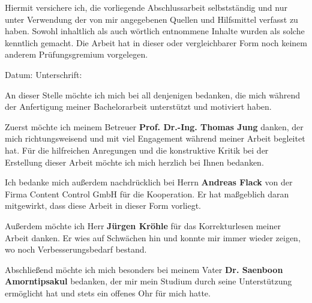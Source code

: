 \label{erklaerung}

Hiermit versichere ich, die vorliegende Abschlussarbeit selbstständig und nur unter Verwendung der von mir angegebenen Quellen und Hilfsmittel verfasst zu haben. Sowohl inhaltlich als auch wörtlich entnommene Inhalte wurden als solche kenntlich gemacht. Die Arbeit hat in dieser oder vergleichbarer Form noch keinem anderem Prüfungsgremium vorgelegen.\bigskip
\bigskip
\bigskip

Datum:	\hrulefill\enspace Unterschrift: \hrulefill

\newpage
{}
\label{danksagungen}
An dieser Stelle möchte ich mich bei all denjenigen bedanken, die mich während der Anfertigung meiner Bachelorarbeit unterstützt und motiviert haben.\bigskip

Zuerst möchte ich meinem Betreuer \textbf{Prof. Dr.-Ing. Thomas Jung} danken, der mich richtungsweisend und mit viel Engagement während meiner Arbeit begleitet hat. Für die hilfreichen Anregungen und die konstruktive Kritik bei der Erstellung dieser Arbeit möchte ich mich herzlich bei Ihnen bedanken.\bigskip

Ich bedanke mich außerdem nachdrücklich bei Herrn \textbf{Andreas Flack} von der Firma Content Control GmbH für die Kooperation. Er hat maßgeblich daran mitgewirkt, dass diese Arbeit in dieser Form vorliegt.\bigskip

Außerdem möchte ich Herr \textbf{Jürgen Kröhle} für das Korrekturlesen meiner Arbeit danken. Er wies auf Schwächen hin und konnte mir immer wieder zeigen, wo noch Verbesserungsbedarf bestand.\bigskip

Abschließend möchte ich mich besonders bei meinem Vater \textbf{Dr. Saenboon Amorntipsakul} bedanken, der mir mein Studium durch seine Unterstützung ermöglicht hat und stets ein offenes Ohr für mich hatte.  


